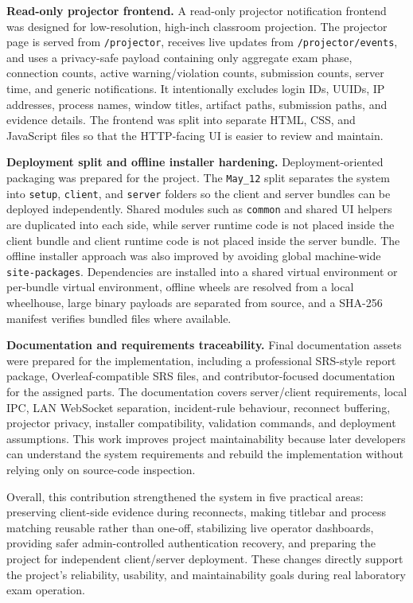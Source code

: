 \textbf{Read-only projector frontend.} A read-only projector notification frontend was designed for low-resolution, high-inch classroom projection. The projector page is served from \texttt{/projector}, receives live updates from \texttt{/projector/events}, and uses a privacy-safe payload containing only aggregate exam phase, connection counts, active warning/violation counts, submission counts, server time, and generic notifications. It intentionally excludes login IDs, UUIDs, IP addresses, process names, window titles, artifact paths, submission paths, and evidence details. The frontend was split into separate HTML, CSS, and JavaScript files so that the HTTP-facing UI is easier to review and maintain.

\textbf{Deployment split and offline installer hardening.} Deployment-oriented packaging was prepared for the project. The \texttt{May\_12} split separates the system into \texttt{setup}, \texttt{client}, and \texttt{server} folders so the client and server bundles can be deployed independently. Shared modules such as \texttt{common} and shared UI helpers are duplicated into each side, while server runtime code is not placed inside the client bundle and client runtime code is not placed inside the server bundle. The offline installer approach was also improved by avoiding global machine-wide \texttt{site-packages}. Dependencies are installed into a shared virtual environment or per-bundle virtual environment, offline wheels are resolved from a local wheelhouse, large binary payloads are separated from source, and a SHA-256 manifest verifies bundled files where available.

\textbf{Documentation and requirements traceability.} Final documentation assets were prepared for the implementation, including a professional SRS-style report package, Overleaf-compatible SRS files, and contributor-focused documentation for the assigned parts. The documentation covers server/client requirements, local IPC, LAN WebSocket separation, incident-rule behaviour, reconnect buffering, projector privacy, installer compatibility, validation commands, and deployment assumptions. This work improves project maintainability because later developers can understand the system requirements and rebuild the implementation without relying only on source-code inspection.

Overall, this contribution strengthened the system in five practical areas: preserving client-side evidence during reconnects, making titlebar and process matching reusable rather than one-off, stabilizing live operator dashboards, providing safer admin-controlled authentication recovery, and preparing the project for independent client/server deployment. These changes directly support the project's reliability, usability, and maintainability goals during real laboratory exam operation.

